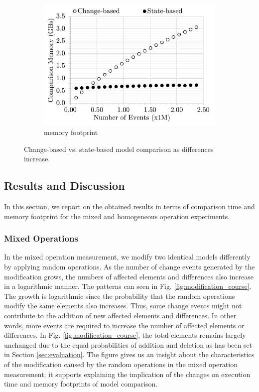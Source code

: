 \begin{figure}
\begin{subfigure}[t]{0.33\linewidth}
        \includegraphics[width=\linewidth]{mixed-memory-events}
        \caption{memory footprint}
        \label{fig:memory_diffs}
    \end{subfigure}
    \caption{Change-based vs. state-based model comparison as differences increase.}
    \label{fig:change_vs_state}
\end{figure}

\vspace{-5pt}
\subsection{Results and Discussion}
\label{sec:discussion}
In this section, we report on the obtained results in terms of comparison time and memory footprint for the mixed and homogeneous operation experiments. 

\vspace{-5pt}
\subsubsection{Mixed Operations}
\label{sec:mixed-operation}

In the mixed operation measurement, we modify two identical models differently by applying random operations. As the number of change events generated by the modification grows, the numbers of affected elements and differences also increase in a logarithmic manner. The patterns can seen in Fig. \ref{fig:modification_course}. The growth is logarithmic since the probability that the random operations modify the same elements also increases. Thus, some change events might not contribute to the addition of new affected elements and differences. In other words, more events are required to increase the number of affected elements or differences. In Fig. \ref{fig:modification_course}, the total elements remains largely unchanged due to the equal probabilities of addition and deletion as has been set in Section \ref{sec:evaluation}. The figure gives us an insight about the characteristics of the modification caused by the random operations in the mixed operation measurement; it supports explaining the implication of the changes on execution time and memory footprints of model comparison.

